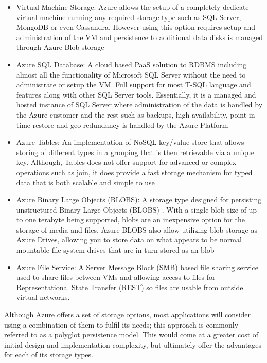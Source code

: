 \begin{itemize}
\item Virtual Machine Storage: Azure allows the setup of a completely dedicate virtual machine running any required storage type such as SQL Server, MongoDB or even Cassandra. However using this option requires setup and administration of the VM and persistence to additional data disks is managed through Azure Blob storage
\item Azure SQL Database: A cloud based PaaS solution to RDBMS including almost all the functionality of Microsoft SQL Server without the need to administrate or setup the VM.  Full support for most T-SQL language and features along with other SQL Server tools. Essentially, it is a managed and hosted instance of SQL Server where administration of the data is handled by the Azure customer and the rest such as backups, high availability, point in time restore and geo-redundancy is handled by the Azure Platform \cite{Microsoft_Corporation_undated-ej}
\item Azure Tables: An implementation of NoSQL key/value store that allows storing of different types in a grouping that is then retrievable via a unique key. Although, Tables does not offer support for advanced or complex operations such as join, it does provide a fast storage mechanism for typed data that is both scalable and simple to use \cite{Microsoft_Corporation_undated-ej}.
\item Azure Binary Large Objects (BLOBS): A storage type designed for persisting unstructured Binary Large Objects (BLOBS) \cite{Microsoft_Corporation_undated-ej}. With a single blob size of up to one terabyte being supported, blobs are an inexpensive option for the storage of media and files. Azure BLOBS also allow utilizing blob storage as Azure Drives, allowing you to store data on what appears to be normal mountable file system drives that are in turn stored as an blob
\item Azure File Service: A Server Message Block (SMB) based file sharing service used to share files between VMs and allowing access to files for Representational State Transfer (REST) so files are usable from outside virtual networks.
\end{itemize}


Although Azure offers a set of storage options, most applications will consider using a combination of them to fulfil its needs; this approach is commonly referred to as a polyglot persistence  model. This would come at a greater cost of initial design and implementation complexity, but ultimately offer the advantages for each of its storage types.
 
